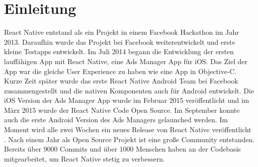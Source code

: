 \section{Einleitung}
React Native entstand als ein Projekt in einem Facebook Hackathon im Jahr 2013. Daraufhin wurde das Projekt bei Facebook weiterentwickelt und erste kleine Testapps entwickelt. Im Juli 2014 begann die Entwicklung der ersten lauffähigen App mit React Native, eine Ads Manager App für iOS. Das Ziel der App war die gleiche User Experience zu haben wie eine App in Objective-C. Kurze Zeit später wurde das erste React Native Android Team bei Facebook zusammengestellt und die nativen Komponenten auch für Android entwickelt. Die iOS Version der Ads Manager App wurde im Februar 2015 veröffentlicht und im März 2015 wurde der React Native Code Open Source. Im September konnte auch die erste Android Version des Ads Managers gelaunched werden. Im Moment wird alle zwei Wochen ein neues Release von React Native veröffentlicht \cite{Konicek_review_2016}. Nach einem Jahr als Open Source Projekt ist eine große Community entstanden. Bereits über 9000 Commits und über 1000 Menschen haben an der Codebasis mitgearbeitet, um React Native stetig zu verbessern.